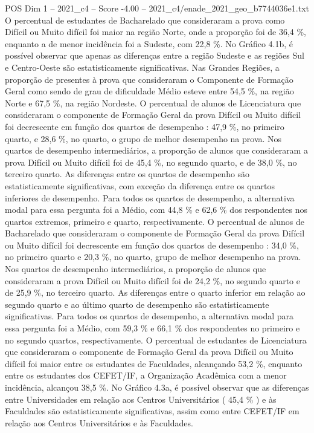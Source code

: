 \begin{textsample}{POS Dim 1 – 2021\_c4 – Score -4.00 – 2021\_c4/enade\_2021\_geo\_b7744036e1.txt}
O percentual de estudantes de Bacharelado que consideraram a prova como Difícil ou Muito difícil foi maior na região Norte, onde a proporção foi de 36,4 \%, enquanto a de menor incidência foi a Sudeste, com 22,8 \%.
No Gráfico 4.1b, é possível observar que apenas as diferenças entre a região Sudeste e as regiões Sul e Centro-Oeste são estatisticamente significativas.
Nas Grandes Regiões, a proporção de presentes à prova que consideraram o Componente de Formação Geral como sendo de grau de dificuldade Médio esteve entre 54,5 \%, na região Norte e 67,5 \%, na região Nordeste.
O percentual de alunos de Licenciatura que consideraram o componente de Formação Geral da prova Difícil ou Muito difícil foi decrescente em função dos quartos de desempenho : 47,9 \%, no primeiro quarto, e 28,6 \%, no quarto, o grupo de melhor desempenho na prova.
Nos quartos de desempenho intermediários, a proporção de alunos que consideraram a prova Difícil ou Muito difícil foi de 45,4 \%, no segundo quarto, e de 38,0 \%, no terceiro quarto.
As diferenças entre os quartos de desempenho são estatisticamente significativas, com exceção da diferença entre os quartos inferiores de desempenho.
Para todos os quartos de desempenho, a alternativa modal para essa pergunta foi a Médio, com 44,8 \% e 62,6 \% dos respondentes nos quartos extremos, primeiro e quarto, respectivamente.
O percentual de alunos de Bacharelado que consideraram o componente de Formação Geral da prova Difícil ou Muito difícil foi decrescente em função dos quartos de desempenho : 34,0 \%, no primeiro quarto e 20,3 \%, no quarto, grupo de melhor desempenho na prova.
Nos quartos de desempenho intermediários, a proporção de alunos que consideraram a prova Difícil ou Muito difícil foi de 24,2 \%, no segundo quarto e de 25,9 \%, no terceiro quarto.
As diferenças entre o quarto inferior em relação ao segundo quarto e ao último quarto de desempenho são estatisticamente significativas.
Para todos os quartos de desempenho, a alternativa modal para essa pergunta foi a Médio, com 59,3 \% e 66,1 \% dos respondentes no primeiro e no segundo quartos, respectivamente.
O percentual de estudantes de Licenciatura que consideraram o componente de Formação Geral da prova Difícil ou Muito difícil foi maior entre os estudantes de Faculdades, alcançando 53,2 \%, enquanto entre os estudantes dos CEFET/IF, a Organização Acadêmica com a menor incidência, alcançou 38,5 \%.
No Gráfico 4.3a, é possível observar que as diferenças entre Universidades em relação aos Centros Universitários ( 45,4 \% ) e às Faculdades são estatisticamente significativas, assim como entre CEFET/IF em relação aos Centros Universitários e às Faculdades.

\end{textsample}
